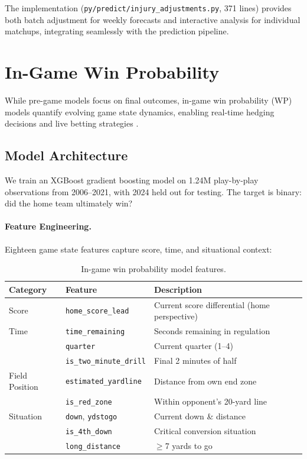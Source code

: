 The implementation (\texttt{py/predict/injury\_adjustments.py}, 371 lines) provides both batch adjustment for weekly forecasts and interactive analysis for individual matchups, integrating seamlessly with the prediction pipeline.

\section{In-Game Win Probability}
\label{sec:ingame-wp}

While pre-game models focus on final outcomes, in-game win probability (WP) models quantify evolving game state dynamics, enabling real-time hedging decisions and live betting strategies \citep{lock2014}.

\subsection{Model Architecture}

We train an XGBoost gradient boosting model on 1.24M play-by-play observations from 2006--2021, with 2024 held out for testing. The target is binary: did the home team ultimately win?

\paragraph{Feature Engineering.}
Eighteen game state features capture score, time, and situational context:

\begin{table}[h]
\centering
\small
\caption[In-game WP features]{In-game win probability model features.}
\label{tab:ingame-features}
\begin{tabular}{llp{6cm}}
\toprule
\textbf{Category} & \textbf{Feature} & \textbf{Description} \\
\midrule
Score & \texttt{home\_score\_lead} & Current score differential (home perspective) \\
Time & \texttt{time\_remaining} & Seconds remaining in regulation \\
& \texttt{quarter} & Current quarter (1--4) \\
& \texttt{is\_two\_minute\_drill} & Final 2 minutes of half \\
Field Position & \texttt{estimated\_yardline} & Distance from own end zone \\
& \texttt{is\_red\_zone} & Within opponent's 20-yard line \\
Situation & \texttt{down}, \texttt{ydstogo} & Current down \& distance \\
& \texttt{is\_4th\_down} & Critical conversion situation \\
& \texttt{long\_distance} & $\geq$7 yards to go \\
\bottomrule
\end{tabular}
\end{table}

